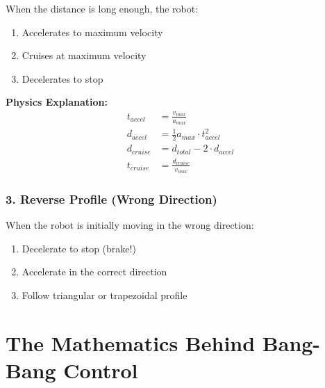 \documentclass[12pt,a4paper]{article}
\begin{document}
When the distance is long enough, the robot:
\begin{enumerate}
    \item Accelerates to maximum velocity
    \item Cruises at maximum velocity
    \item Decelerates to stop
\end{enumerate}

\begin{center}
\end{center}

\textbf{Physics Explanation:}
\begin{align}
    t_{accel} &= \frac{v_{max}}{a_{max}} \\
    d_{accel} &= \frac{1}{2} a_{max} \cdot t_{accel}^2 \\
    d_{cruise} &= d_{total} - 2 \cdot d_{accel} \\
    t_{cruise} &= \frac{d_{cruise}}{v_{max}}
\end{align}

\subsubsection{3. Reverse Profile (Wrong Direction)}

When the robot is initially moving in the wrong direction:
\begin{enumerate}
    \item Decelerate to stop (brake!)
    \item Accelerate in the correct direction
    \item Follow triangular or trapezoidal profile
\end{enumerate}

\section{The Mathematics Behind Bang-Bang Control}
\end{document}
